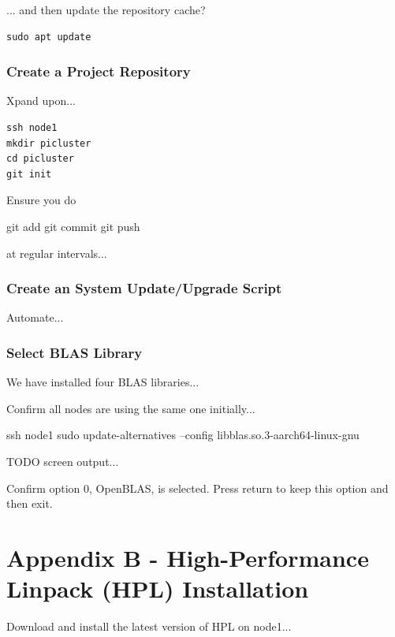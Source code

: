 \documentclass{article}
\begin{document}
... and then update the repository cache? 

\begin{lstlisting}[]
sudo apt update
\end{lstlisting}


\subsubsection{Create a Project Repository}

Xpand upon...

\begin{lstlisting}[]
ssh node1
mkdir picluster
cd picluster
git init
\end{lstlisting}

Ensure you do  

git add
git commit
git push

at regular intervals...



\subsubsection{Create an System Update/Upgrade Script}

Automate...





\subsubsection{Select BLAS Library}

We have installed four BLAS libraries...

Confirm all nodes are using the same one initially...

ssh node1
sudo update-alternatives --config libblas.so.3-aarch64-linux-gnu

TODO screen output...

Confirm option 0, OpenBLAS, is selected. Press return to keep this option and then exit.



%
%
\clearpage\section{Appendix B - High-Performance Linpack (HPL) Installation}

Download and install the latest version of HPL on node1...
\end{document}
